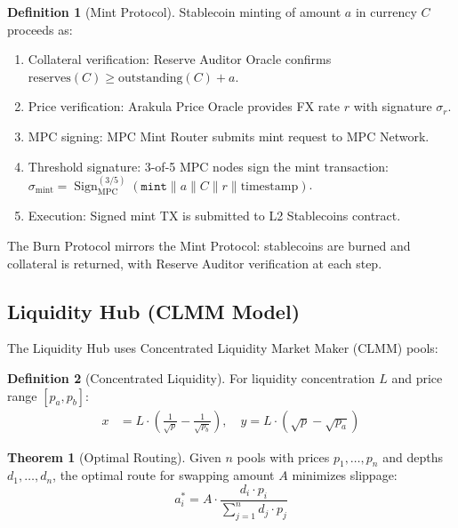 \documentclass[12pt,a4paper]{article}
\theoremstyle{definition}
\newtheorem{definition}{Definition}[section]
\newtheorem{theorem}{Theorem}[section]
\theoremstyle{remark}
\DeclareMathOperator{\Sign}{Sign}
\begin{document}
\begin{definition}[Mint Protocol]
Stablecoin minting of amount $a$ in currency $C$ proceeds as:
\begin{enumerate}[nosep]
    \item Collateral verification: Reserve Auditor Oracle confirms $\text{reserves}(C) \geq \text{outstanding}(C) + a$.
    \item Price verification: Arakula Price Oracle provides FX rate $r$ with signature $\sigma_r$.
    \item MPC signing: MPC Mint Router submits mint request to MPC Network.
    \item Threshold signature: 3-of-5 MPC nodes sign the mint transaction: $\sigma_{\text{mint}} = \Sign^{(3/5)}_{\text{MPC}}(\texttt{mint} \| a \| C \| r \| \text{timestamp})$.
    \item Execution: Signed mint TX is submitted to L2 Stablecoins contract.
\end{enumerate}
\end{definition}

The Burn Protocol mirrors the Mint Protocol: stablecoins are burned and collateral is returned, with Reserve Auditor verification at each step.

\subsection{Liquidity Hub (CLMM Model)}

The Liquidity Hub uses Concentrated Liquidity Market Maker (CLMM) pools:

\begin{definition}[Concentrated Liquidity]
For liquidity concentration $L$ and price range $[p_a, p_b]$:
\begin{align}
x &= L \cdot \left(\frac{1}{\sqrt{p}} - \frac{1}{\sqrt{p_b}}\right), \quad
y = L \cdot (\sqrt{p} - \sqrt{p_a})
\end{align}
\end{definition}

\begin{theorem}[Optimal Routing]
\label{thm:optimal-routing}
Given $n$ pools with prices $p_1, \ldots, p_n$ and depths $d_1, \ldots, d_n$, the optimal route for swapping amount $A$ minimizes slippage:
\begin{equation}
a_i^* = A \cdot \frac{d_i \cdot p_i}{\sum_{j=1}^{n} d_j \cdot p_j}
\end{equation}
\end{theorem}
\end{document}
